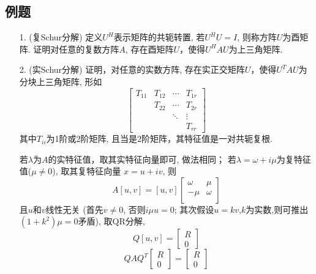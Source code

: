 \subsection*{例题}
\begin{itemize}
	\item[1.] (复Schur分解) 定义$U^H$表示矩阵的共轭转置, 若$U^H U = I$, 
	则称方阵$U$为酉矩阵. 
	证明对任意的复数方阵$A$, 存在酉矩阵$U$，使得$U^H A U$为上三角矩阵.
	\vspace{2cm}

	\item[2.] (实Schur分解) 证明，对任意的实数方阵, 
	存在实正交矩阵$U$，使得$U^T A U$为分块上三角矩阵, 形如
	\begin{equation}\nonumber
	\begin{bmatrix}
		T_{11}& T_{12}& \cdots& T_{1r}\\
		& T_{22}& \cdots& T_{2r}\\
		& &  \ddots& \vdots\\
		& &  &T_{rr}
	\end{bmatrix}
	\end{equation}
	其中$T_{ii}$为1阶或2阶矩阵, 且当是2阶矩阵，其特征值是一对共轭复根.
	\begin{solution}
		若$\lambda$为$A$的实特征值，取其实特征向量即可, 做法相同；
		若$\lambda = \omega + i\mu$为复特征值($\mu \ne 0$), 取其复特征向量
		$x = u +iv$, 则
		\begin{equation}
		\nonumber
		A[u,v] = [u, v]\begin{bmatrix}
			\omega& \mu\\
			-\mu   & \omega\\
		\end{bmatrix}
		\end{equation}
		且$u$和$v$线性无关
		(首先$v \ne 0$, 否则$i\mu u=0$;
		其次假设$u = kv$,$k$为实数,则可推出$(1+k^2)\mu = 0$矛盾),
		取QR分解,
		\begin{equation}
		\nonumber
		Q[u,v] = \begin{bmatrix}
			R\\
			0
		\end{bmatrix}
		\end{equation}
		\begin{equation}
		\nonumber
		QAQ^T\begin{bmatrix}
			R\\
			0
		\end{bmatrix}
		 = 
		\begin{bmatrix}
			R\\
			0
		\end{bmatrix}

\end{equation}
\end{solution}
\end{itemize}
